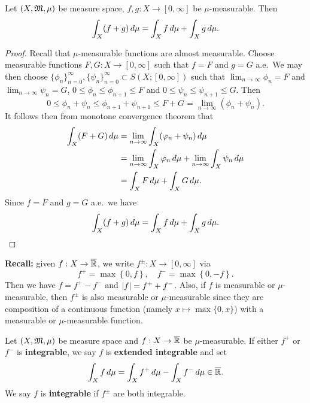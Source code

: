 \documentclass[a4paper]{article}
\renewcommand{\seqinfn}[1]{\{ #1 \}_{n=0}^\infty}
\begin{document}
\begin{thm}
  Let $(X, \mathfrak{M}, \mu)$ be measure space, $f, g : X \to [0, \infty]$ be
  $\mu$-measurable. Then
  \[
    \int_X (f + g) \, d \mu = \int_X f \, d \mu + \int_X g \, d \mu.
  \]
\end{thm}

\begin{proof}
  Recall that $\mu$-measurable functions are almost measurable. Choose
  measurable functions $F, G : X \to [0, \infty]$ such that $f = F$ and $g
    = G$ a.e.\ We may then choose $\seqinfn{\phi_n}, \seqinfn{\psi_n}
    \subset S(X; [0, \infty])$ such that $\lim_{n \to \infty} \phi_n = F$
  and $\lim_{n \to \infty} \psi_n = G$, $0 \leq \phi_n \leq \phi_{n+1}
    \leq F$ and $0 \leq \psi_n \leq \psi_{n+1} \leq G$. Then
  \[
    0 \leq \phi_n + \psi_n \leq \phi_{n+1} + \psi_{n+1}
    \leq F + G = \lim_{n \to \infty} (\phi_n + \psi_n).
  \]
  It follows then from monotone convergence theorem that
  \[
    \begin{aligned}
      \int_X (F + G) \, d \mu
       & = \lim_{n \to \infty} \int_X (\varphi_n + \psi_n) \, d \mu \\
       & = \lim_{n \to \infty} \int_X \varphi_n \, d \mu
      + \lim_{n \to \infty} \int_X \psi_n \, d \mu               \\
       & = \int_X F \, d \mu + \int_X G \, d \mu.
    \end{aligned}
  \]
  Since $f = F$ and $g = G$ a.e.\, we have
  \[
    \int_X (f + g) \, d \mu = \int_X f \, d \mu + \int_X g \, d \mu.
  \]
\end{proof}

\textbf{Recall:} given $f: X \to \overline{\mathbb{R}}$,
we write $f^{\pm} : X \to [0, \infty]$ via
\[
  f^+ = \max\left\{ 0, f \right\}, \quad
  f^- = \max\left\{ 0, -f \right\}.
\]
Then we have $f = f^+ - f^-$ and $\left\lvert f\right\rvert = f^+ + f^-$. Also, if $f$ is
  measurable or $\mu$-measurable, then $f^\pm$ is also measurable or
  $\mu$-measurable since they are composition of a continuous function
  (namely $x \mapsto \max \{0, x\}$) with a measurable or $\mu$-measurable
  function.

\begin{defi}
  Let $(X, \mathfrak{M}, \mu)$ be measure space and $f : X \to \overline{\mathbb{R}}$ be
  $\mu$-measurable. If either $f^+$ or $f^-$ is \textbf{integrable}, we
  say $f$ is \textbf{extended integrable} and set
  \[
    \int_X f \, d \mu = \int_X f^+ \, d \mu - \int_X f^- \, d \mu
    \in \overline{\mathbb{R}}.
  \]
  We say $f$ is \textbf{integrable} if $f^\pm$ are both integrable.
\end{defi}
\end{document}
